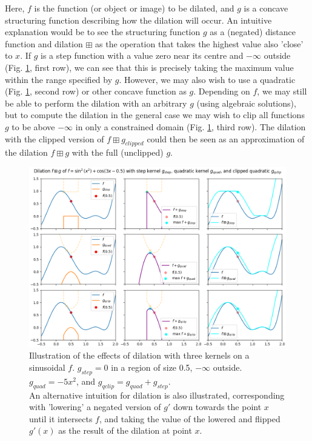 \documentclass[11pt]{article} %
\begin{document}
Here, $f$ is the function (or object or image) to be dilated, and $g$ is a concave structuring function describing how the dilation will occur. An intuitive explanation would be to see the structuring function $g$ as a (negated) distance function and dilation $\boxplus$ as the operation that takes the highest value also 'close' to $x$. If $g$ is a step function with a value zero near its centre and $-\infty$ outside (Fig. \ref{fig:dil-illust}, first row), we can see that this is precisely taking the maximum value within the range specified by $g$. However, we may also wish to use a quadratic (Fig. \ref{fig:dil-illust}, second row) or other concave function as $g$. Depending on $f$, we may still be able to perform the dilation with an arbitrary $g$ (using algebraic solutions), but to compute the dilation in the general case we may wish to clip all functions $g$ to be above $-\infty$ in only a constrained domain (Fig. \ref{fig:dil-illust}, third row). The dilation with the clipped version of $f\boxplus g_{clipped}$ could then be seen as an approximation of the dilation $f\boxplus g$ with the full (unclipped) $g$.

\begin{figure}[h!]
  \includegraphics[width=\textwidth]{figures/dilation_illustration.png}
  \caption{Illustration of the effects of dilation with three kernels on a sinusoidal $f$. $g_{step}=0$ in a region of size 0.5, $-\infty$ outside. $g_{quad}=-5x^2$, and $g_{qclip}=g_{quad}+g_{step}$. \\An alternative intuition for dilation is also illustrated, corresponding with 'lowering' a negated version of $g'$ down towards the point $x$ until it intersects $f$, and taking the value of the lowered and flipped $g'(x)$ as the result of the dilation at point $x$.}
  \label{fig:dil-illust}
\end{figure}
\end{document}
